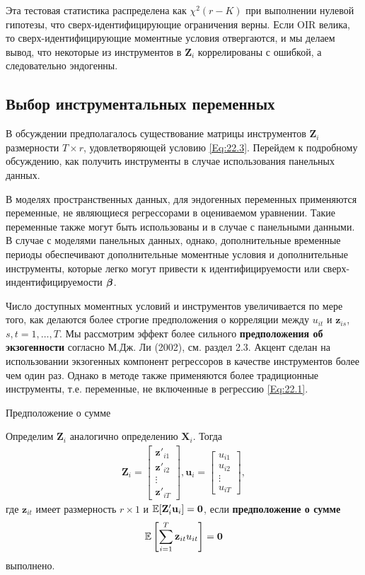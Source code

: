 Эта тестовая статистика  распределена как $\chi^2(r-K)$ при выполнении нулевой гипотезы, что сверх-идентифицирующие ограничения верны. Если OIR  велика, то сверх-идентифицирующие моментные условия отвергаются, и мы делаем вывод, что некоторые из инструментов в $\mathbf Z_i$ коррелированы  с ошибкой, а следовательно эндогенны.

\subsection{Выбор инструментальных переменных}

В обсуждении предполагалось существование матрицы инструментов $\mathbf Z_i$ размерности $T \times r$, удовлетворяющей условию \ref{Eq:22.3}. Перейдем к подробному обсуждению, как получить инструменты в случае использования панельных данных.

В моделях пространственных данных, для эндогенных переменных применяются переменные, не являющиеся регрессорами в оцениваемом уравнении. Такие переменные также могут быть использованы и в случае с панельными данными. В случае с моделями панельных данных, однако, дополнительные временные периоды обеспечивают дополнительные моментные условия и дополнительные инструменты, которые легко могут привести к идентифицируемости или сверх-индентифицируемости $\bm{\beta}$.

Число доступных моментных условий и инструментов увеличивается по мере того, как делаются более строгие предположения о корреляции между $u_{it}$ и $\mathbf z_{is}$, $s,t=1, \dots, T$. Мы рассмотрим эффект более сильного \textbf{предположения об экзогенности} согласно М.Дж. Ли (2002), см. раздел 2.3. Акцент сделан на использовании экзогенных компонент регрессоров в качестве инструментов более чем один раз. Однако в методе также применяются более традиционные инструменты, т.е. переменные, не включенные в регрессию \ref{Eq:22.1}.

{\centering  Предположение о сумме}

Определим $\mathbf Z_i$ аналогично определению $\mathbf X_i$. Тогда
\begin{align}
\mathbf Z_i=
\begin{bmatrix}
\mathbf z'_{i1} \\
\mathbf z'_{i2} \\
\vdots \\
\mathbf z'_{iT}  
\end{bmatrix},
\mathbf u_i=
\begin{bmatrix}
u_{i1} \\
u_{i2} \\
\vdots \\
u_{iT}
\end{bmatrix},
\label{Eq:22.11}
\end{align}
где $\mathbf z_{it}$ имеет размерность $r \times 1$ и $\mathbb{E}[ \mathbf Z'_i \mathbf u_i]= \mathbf 0$, если \textbf{предположение о сумме}
\begin{align}
\mathbb{E} \left[ \sum^T_{i=1} \mathbf z_{it} u_{it} \right] =\mathbf 0
\label{Eq:22.12}
\end{align}
выполнено.

